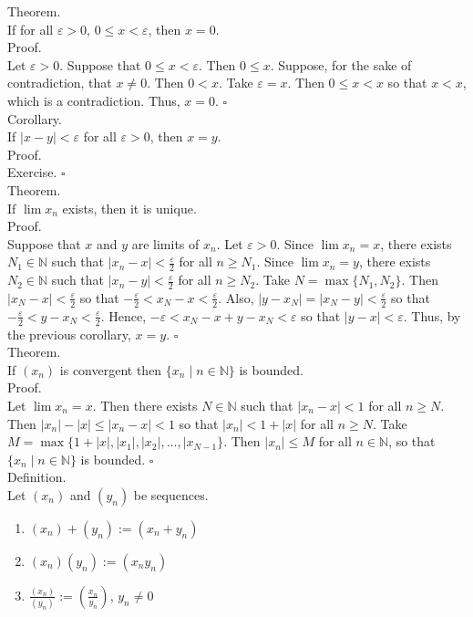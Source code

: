 \documentclass[twocolumn]{article}
\newcommand{\qed}{$\square$}
\newcommand{\br}{\vspace{\baselineskip}}
\let\eps\varepsilon
\newcommand{\naturals}{\mathbb{N}}
\begin{document}
Theorem. \\
If for all $\eps > 0$, $0 \leq x < \eps$, then $x = 0$. \\
Proof. \\
Let $\eps > 0$. Suppose that $0 \leq x < \eps$. Then $0 \leq x$. Suppose, for the sake of contradiction, that $x \neq 0$. Then $0 < x$. Take $\eps = x$. Then $0 \leq x < x$ so that $x < x$, which is a contradiction. Thus, $x = 0$. \qed \\

Corollary. \\
If $|x - y| < \eps$ for all $\eps > 0$, then $x = y$. \\
Proof. \\
Exercise. \qed \\

Theorem. \\
If $\lim x_n$ exists, then it is unique. \\
Proof. \\
Suppose that $x$ and $y$ are limits of $x_n$. Let $\eps > 0$. Since $\lim x_n = x$, there exists $N_1 \in \naturals$ such that $|x_n - x| < \frac{\eps}{2}$ for all $n \geq N_1$. Since $\lim x_n = y$, there exists $N_2 \in \naturals$ such that $|x_n - y| < \frac{\eps}{2}$ for all $n \geq N_2$. Take $N = \max \{ N_1, N_2 \}$. Then $|x_N - x| < \frac{\eps}{2}$ so that $-\frac{\eps}{2} < x_N - x < \frac{\eps}{2}$. Also, $|y - x_N| = |x_N - y| < \frac{\eps}{2}$ so that $-\frac{\eps}{2} < y - x_N < \frac{\eps}{2}$. Hence, $-\eps < x_N - x + y - x_N < \eps$ so that $|y - x| < \eps$. Thus, by the previous corollary, $x = y$. \qed \\

Theorem. \\
If $(x_n)$ is convergent then $\{ x_n \mid n \in \naturals \}$ is bounded. \\
Proof. \\
Let $\lim x_n = x$. Then there exists $N \in \naturals$ such that $|x_n - x| < 1$ for all $n \geq N$. Then $|x_n| - |x| \leq |x_n - x| < 1$ so that $|x_n| < 1 + |x|$ for all $n \geq N$. Take $M = \max \{ 1 + |x|, |x_1|, |x_2|, \ldots, |x_{N - 1} \}$. Then $|x_n| \leq M$ for all $n \in \naturals$, so that $\{ x_n \mid n \in \naturals \}$ is bounded. \qed \\

Definition. \\
Let $(x_n)$ and $(y_n)$ be sequences.
\begin{enumerate}
	\item
	$(x_n) + (y_n) := (x_n + y_n)$
	\item
	$(x_n)(y_n) := (x_ny_n)$
	\item
	$\frac{(x_n)}{(y_n)} := (\frac{x_n}{y_n})$, $y_n \neq 0$
\end{enumerate} \br
\end{document}

